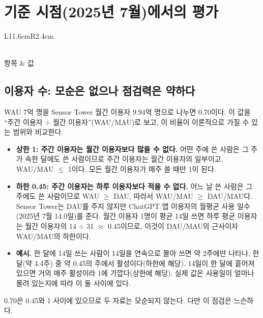 \documentclass[11pt]{article}
\begin{document}
\section{기준 시점(2025년 7월)에서의 평가}

\begin{longtable}{L{11.6cm}R{2.4cm}}
\caption{2025년 7월 기준값과 Sensor Tower ChatGPT 값}\label{tab:anchor}\\
\toprule
항목 & 값 \\
\midrule
\endhead

\bottomrule
\end{longtable}

\subsection{이용자 수: 모순은 없으나 점검력은 약하다}

WAU 7억 명을 Sensor Tower 월간 이용자 9.94억 명으로 나누면 0.70이다. 이 값을 ``주간 이용자 $\div$ 월간 이용자''(WAU/MAU)로 보고, 이 비율이 이론적으로 가질 수 있는 범위와 비교한다.

\begin{itemize}
  \item \textbf{상한 1: 주간 이용자는 월간 이용자보다 많을 수 없다.} 어떤 주에 쓴 사람은 그 주가 속한 달에도 쓴 사람이므로 주간 이용자는 월간 이용자의 일부이고, WAU/MAU $\le$ 1이다. 모든 월간 이용자가 매주 쓸 때만 1이 된다.
  \item \textbf{하한 0.45: 주간 이용자는 하루 이용자보다 적을 수 없다.} 어느 날 쓴 사람은 그 주에도 쓴 사람이므로 WAU $\ge$ DAU, 따라서 WAU/MAU $\ge$ DAU/MAU다. Sensor Tower는 DAU를 주지 않지만 ChatGPT 앱 이용자의 월평균 사용 일수(2025년 7월 14.0일)를 준다. 월간 이용자 1명이 평균 14일 쓰면 하루 평균 이용자는 월간 이용자의 14 $\div$ 31 $\approx$ 0.45이므로, 이것이 DAU/MAU의 근사이자 WAU/MAU의 하한이다.
  \item \textbf{예시.} 한 달에 14일 쓰는 사람이 14일을 연속으로 몰아 쓰면 약 2주에만 나타나, 한 달(약 4.4주) 중 약 0.45의 주에서 활성이다(하한에 해당). 14일이 한 달에 흩어져 있으면 거의 매주 활성이라 1에 가깝다(상한에 해당). 실제 값은 사용일이 얼마나 몰려 있는지에 따라 이 둘 사이에 있다.
\end{itemize}

0.70은 0.45와 1 사이에 있으므로 두 자료는 모순되지 않는다. 다만 이 점검은 느슨하다.
\end{document}

